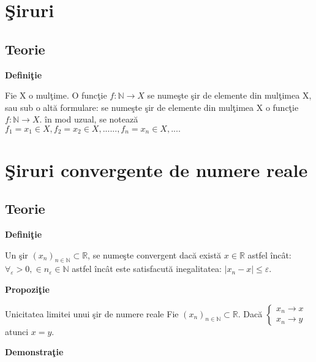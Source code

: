 \documentclass[a4paper,12pt,oneside]{report}
\begin{document}
\maketitle

\tableofcontents



\chapter{\c Siruri}

\section{Teorie}

\textbf{Defini\c tie}

Fie X o mul\c time. O func\c tie \(f:\mathbb{N} \to X\) se nume\c ste \c sir de elemente din mul\c timea X, sau sub o alt\u a formulare: se nume\c ste \c sir de elemente din mul\c timea X o func\c tie \(f:\mathbb{N} \to X\). \^ in mod uzual, se noteaz\u a \(f_{1} = x_{1} \in X, f_{2} = x_{2} \in X,......, f_{n} = x_{n} \in X,....\)

\chapter{\c Siruri convergente de numere reale}

\section{Teorie}

\textbf{Defini\c tie}

Un \c sir \((x_{n})_{n \in \mathbb{N}} \subset \mathbb{R} \), se nume\c ste convergent dac\u a exist\u a \(x \in \mathbb{R}\) astfel \^ inc\^ at:
\(\forall _{\varepsilon } > 0, \in n_{\varepsilon } \in \mathbb{N} \) astfel \^ inc\^ at este satisfacut\u a inegalitatea: \(\left | x_{n}- x \right | \leq \varepsilon \).

\textbf{Propozi\c tie}

Unicitatea limitei unui \c sir de numere reale
Fie \((x_{n})_{n \in \mathbb{N}} \subset \mathbb{R}\). 
Dac\u a \(\left\{\begin{matrix}
x_{n} \to  x\\ 
x_{n} \to y
\end{matrix}\right.
\) atunci \(x=y.\)

\textbf{Demonstra\c tie}
\end{document}
